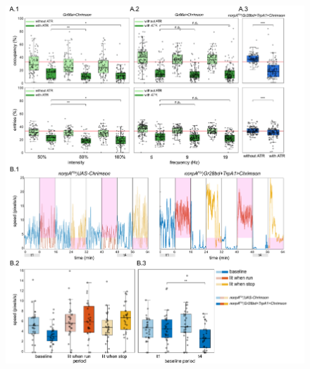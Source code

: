 \documentclass[10pt,letterpaper]{article}
\begin{document}
\clearpage
\begin{figure}
	\includegraphics[width=\linewidth]{../../figures/optogenetics_fig_sm.pdf}
\end{figure}
\end{document}
